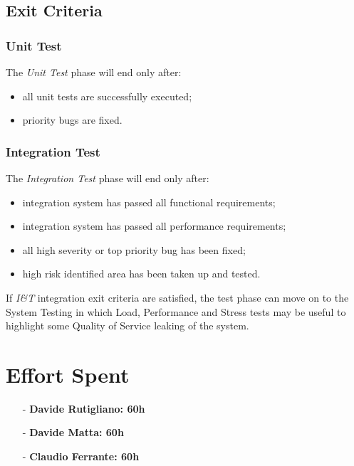\documentclass[a4paper]{article}
\begin{document}
\subsection{Exit Criteria}
\subsubsection{Unit Test}
The \textit{Unit Test} phase will end only after:\\
\begin{itemize}
    \item all unit tests are successfully executed;
    \item priority bugs are fixed.
\end{itemize}

\subsubsection{Integration Test}
The \textit{Integration Test} phase will end only after:\\
\begin{itemize}
    \item integration system has passed all functional requirements;
    \item integration system has passed all performance requirements;
    \item all high severity or top priority bug has been fixed;
    \item high risk identified area has been taken up and tested. \newline
\end{itemize}

If \textit{I\&T} integration exit criteria are satisfied, the test phase can move on to the System Testing in which Load, Performance and Stress tests may be useful to highlight some Quality of Service leaking of the system.

\newpage
\section{Effort Spent}
    \begin{itemize}
        \item[-] \textbf{Davide Rutigliano: 60h}
        
        \item[-] \textbf{Davide Matta: 60h}
        
        \item[-] \textbf{Claudio Ferrante: 60h}
    \end{itemize}
\end{document}
